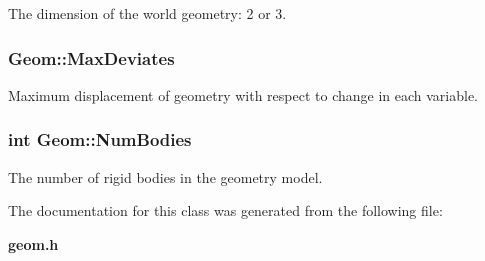 The dimension of the world geometry: 2 or 3.

\subsubsection{ Geom::Max\-Deviates}\label{class_Geom_m2}


Maximum displacement of geometry with respect to change in each variable.

\subsubsection{\setlength{\rightskip}{0pt plus 5cm}int Geom::Num\-Bodies}\label{class_Geom_m0}


The number of rigid bodies in the geometry model.



The documentation for this class was generated from the following file:\begin{CompactItemize}
\item 
{\bf geom.h}\end{CompactItemize}
